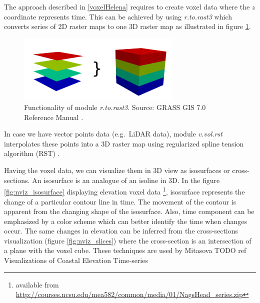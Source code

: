 \documentclass[a4paper,12pt,oneside]{book}
\newcommand{\module}[1]{\textsl{#1}}
\begin{document}
The approach described in \ref{voxelHelena} requires to create voxel data
where the $z$ coordinate represents time.
This can be achieved by using \module{r.to.rast3} \cite{grassUserMan}
which converts series of 2D raster maps to one 3D raster map as illustrated in figure \ref{fig:rtorast3}.

\begin{figure}[h!]
  \centering
  \includegraphics[width=0.7\textwidth]{./images/rtorast3.png}
  \caption[Functionality of module \module{r.to.rast3}]
  {Functionality of module \module{r.to.rast3}. Source: GRASS GIS 7.0 Reference Manual \cite{grassUserMan}.}
  \label{fig:rtorast3}
\end{figure}

In case we have vector points data (e.g.\ LiDAR data), module \module{v.vol.rst} interpolates these points into a 3D raster
map using regularized spline tension algorithm (RST) \cite{mitasova1993interpolation,mitasova1993interpolation2}.

Having the voxel data, we can visualize them in 3D view as isosurfaces
or cross-sections. An isosurface is an analogue of an isoline in 3D.
In the figure \ref{fig:nviz_isosurface} displaying elevation voxel data%
\footnote{available from \url{http://courses.ncsu.edu/mea582/common/media/01/NagsHead_series.zip}},
isosurface represents the change of a particular contour line in time.
The movement of the contour is apparent from the changing shape of the isosurface.
Also, time component can be emphasized by a color scheme which can better identify the time when changes occur.
The same changes in elevation can be inferred from the cross-sections visualization (figure \ref{fig:nviz_slices})
where the cross-section is an intersection of a plane with the voxel cube.
These techniques are used by Mitasova TODO ref Visualizations of Coastal Elevation Time-series
\end{document}
